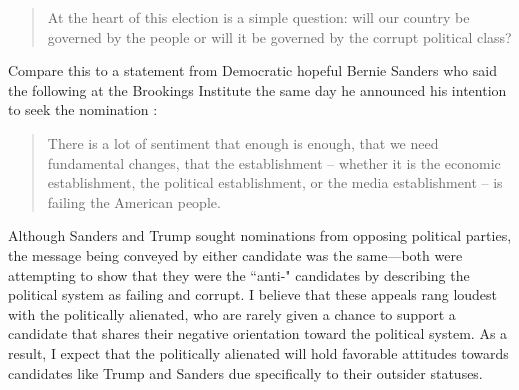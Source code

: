 \documentclass[12pt]{article}
\begin{document}
\begin{quote}
	At the heart of this election is a simple question: will our country be governed by the people or will it be governed by the corrupt political class?
\end{quote}

\noindent Compare this to a statement from Democratic hopeful Bernie Sanders who said the following at the Brookings Institute the same day he announced his intention to seek the nomination \parencite{Dews2015}:

\begin{quote}
	There is a lot of sentiment that enough is enough, that we need fundamental changes, that the establishment -- whether it is the economic establishment, the political establishment, or the media establishment -- is failing the American people.
\end{quote}

\noindent Although Sanders and Trump sought nominations from opposing political parties, the message being conveyed by either candidate was the same---both were attempting to show that they were the ``anti-" candidates by describing the political system as failing and corrupt. I believe that these appeals rang loudest with the politically alienated, who are rarely given a chance to support a candidate that shares their negative orientation toward the political system. As a result, I expect that the politically alienated will hold favorable attitudes towards candidates like Trump and Sanders due specifically to their outsider statuses. 
\end{document}
